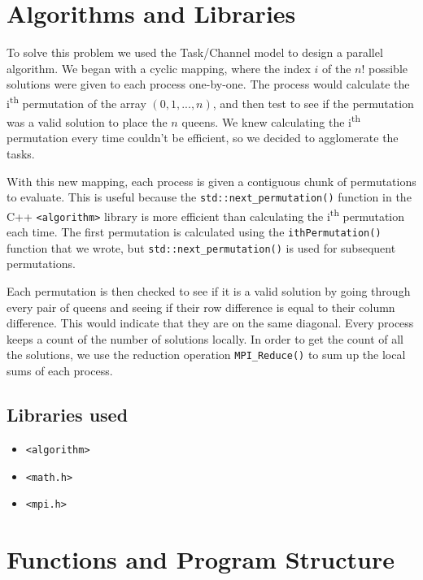 \documentclass{article}
\begin{document}
\section{Algorithms and Libraries}

To solve this problem we used the Task/Channel model to design a parallel 
algorithm. We began with a cyclic mapping, where the index $i$ of the $n!$ 
possible solutions were given to each process one-by-one. The process would 
calculate the i\textsuperscript{th} permutation of the array $(0, 1, ..., n)$, 
and then test to see if the permutation was a valid solution to place the $n$ 
queens. We knew calculating the i\textsuperscript{th} permutation every time 
couldn't be efficient, so we decided to agglomerate the tasks.

\medskip
\noindent
With this new mapping, each process is given a contiguous chunk of permutations 
to evaluate. This is useful because the \texttt{std::next\_permutation()} 
function in the C++ \texttt{<algorithm>} library is more efficient than 
calculating the i\textsuperscript{th} permutation each time. The first 
permutation is calculated using the \texttt{ithPermutation()} function that we 
wrote, but \texttt{std::next\_permutation()} is used for subsequent 
permutations. 

\medskip
\noindent
Each permutation is then checked to see if it is a valid solution by going 
through every pair of queens and seeing if their row difference is equal to 
their column difference. This would indicate that they are on the same diagonal.
Every process keeps a count of the number of solutions locally. In order to get 
the count of all the solutions, we use the reduction operation 
\texttt{MPI\_Reduce()} to sum up the local sums of each process.

\medskip
\noindent
\subsection{Libraries used}
\begin{itemize}
	\item \texttt{<algorithm>}
    \item \texttt{<math.h>}
    \item \texttt{<mpi.h>}
\end{itemize}

\section{Functions and Program Structure}
\end{document}
